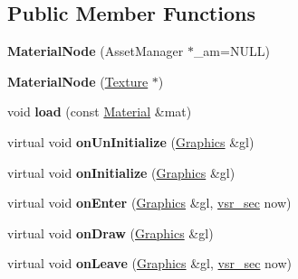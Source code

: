 \subsection*{Public Member Functions}
\begin{DoxyCompactItemize}
\item 
\hypertarget{classvsr_1_1_material_node_abc2b45c131998ad47171797de2f145b9}{{\bfseries Material\-Node} (Asset\-Manager $\ast$\-\_\-am=N\-U\-L\-L)}\label{classvsr_1_1_material_node_abc2b45c131998ad47171797de2f145b9}

\item 
\hypertarget{classvsr_1_1_material_node_a050bc1ace03795093473c433d04164c7}{{\bfseries Material\-Node} (\hyperlink{classvsr_1_1_texture}{Texture} $\ast$)}\label{classvsr_1_1_material_node_a050bc1ace03795093473c433d04164c7}

\item 
\hypertarget{classvsr_1_1_material_node_ae6f7f075deaeb78f9599ac8c7e6e8a59}{void {\bfseries load} (const \hyperlink{classvsr_1_1_material}{Material} \&mat)}\label{classvsr_1_1_material_node_ae6f7f075deaeb78f9599ac8c7e6e8a59}

\item 
\hypertarget{classvsr_1_1_material_node_a36e1530d2acd3109fcd04f287e290eab}{virtual void {\bfseries on\-Un\-Initialize} (\hyperlink{classvsr_1_1_graphics}{Graphics} \&gl)}\label{classvsr_1_1_material_node_a36e1530d2acd3109fcd04f287e290eab}

\item 
\hypertarget{classvsr_1_1_material_node_a0072aae5ec30d56a68afc71fa9240696}{virtual void {\bfseries on\-Initialize} (\hyperlink{classvsr_1_1_graphics}{Graphics} \&gl)}\label{classvsr_1_1_material_node_a0072aae5ec30d56a68afc71fa9240696}

\item 
\hypertarget{classvsr_1_1_material_node_ac062986c7f4cf288f3c8291ee722a4aa}{virtual void {\bfseries on\-Enter} (\hyperlink{classvsr_1_1_graphics}{Graphics} \&gl, \hyperlink{classvsr_1_1vsr__sec}{vsr\-\_\-sec} now)}\label{classvsr_1_1_material_node_ac062986c7f4cf288f3c8291ee722a4aa}

\item 
\hypertarget{classvsr_1_1_material_node_ab94d6aa96300b77af957467ef0ad4d5a}{virtual void {\bfseries on\-Draw} (\hyperlink{classvsr_1_1_graphics}{Graphics} \&gl)}\label{classvsr_1_1_material_node_ab94d6aa96300b77af957467ef0ad4d5a}

\item 
\hypertarget{classvsr_1_1_material_node_afeb0a87759316b46ef9f99cd794a60f9}{virtual void {\bfseries on\-Leave} (\hyperlink{classvsr_1_1_graphics}{Graphics} \&gl, \hyperlink{classvsr_1_1vsr__sec}{vsr\-\_\-sec} now)}\label{classvsr_1_1_material_node_afeb0a87759316b46ef9f99cd794a60f9}

\end{DoxyCompactItemize}

